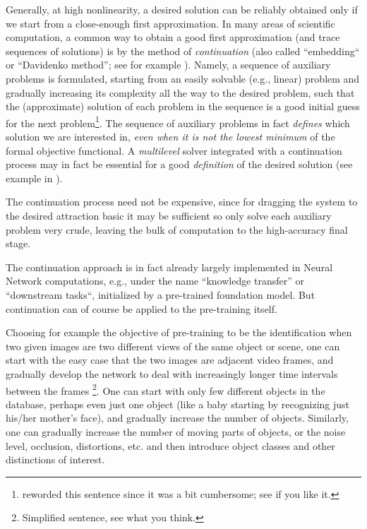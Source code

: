 \documentclass{article} %
\begin{document}
Generally, at high nonlinearity, a desired solution can be reliably obtained only if we start from a close-enough first approximation. In many areas of scientific computation, a common way to obtain a good first approximation (and trace sequences of solutions) is by the method of {\it continuation} (also called ``embedding`` or ``Davidenko method''; see for example \cite{keller77}). Namely, a sequence of auxiliary problems is formulated, starting from an easily solvable (e.g., linear) problem and gradually increasing its complexity all the way to the desired problem, such that the (approximate) solution of each problem in the sequence is a good initial guess for the next problem\footnote{reworded this sentence since it was a bit cumbersome; see if you like it.}. The sequence of auxiliary problems in fact {\it defines} which solution we are interested in, {\it even when it is not the lowest minimum} of the formal objective functional. A {\it multilevel} solver integrated with a continuation process may in fact be essential for a good {\it definition} of the desired solution (see example in \cite{SafRon}).

The continuation process need not be expensive, since for dragging the system to the desired attraction basic it may be sufficient so only solve each auxiliary problem very crude, leaving the bulk of computation to the high-accuracy final stage.

The continuation approach is in fact already largely implemented in Neural Network computations, e.g., under the name ``knowledge transfer'' or ``downstream tasks``, initialized by a pre-trained foundation model. But continuation can of course be applied to the pre-training itself.

Choosing for example the objective of pre-training to be the identification when two given images are two different views of the same object or scene, one can start with the easy case that the two images are adjacent video frames, and gradually develop the network to deal with increasingly longer time intervals between the frames \footnote{Simplified sentence, see what you think.}. One can start with only few different objects in the database, perhaps even just one object (like a baby starting by recognizing just his/her mother's face), and gradually increase the number of objects. Similarly, one can gradually increase the number of moving parts of objects, or the noise level, occlusion, distortions, etc. and then introduce object classes and other distinctions of interest.
\end{document}

